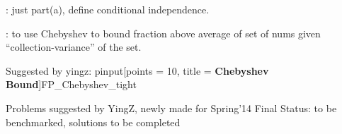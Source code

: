 \documentclass[quiz]{mcs}
\renewcommand{\examspace}[]{}
\begin{document}
\examspace
\begin{editingnotes}
: just part(a), define conditional independence.
\end{editingnotes}

\examspace
{}

\examspace
\begin{editingnotes}
\end{editingnotes}

\examspace
\begin{editingnotes}
: to use Chebyshev to bound fraction above average of
set of nums given ``collection-variance'' of the set.
\end{editingnotes}


\begin{editingnotes}
Suggested by yingz: pinput[points = 10, title = \textbf{Chebyshev Bound}]{FP\_Chebyshev\_tight}
\end{editingnotes}

\examspace
\begin{editingnotes}
Problems suggested by YingZ, newly made for Spring'14 Final
Status: to be benchmarked, solutions to be completed
\end{editingnotes}


\end{document}
